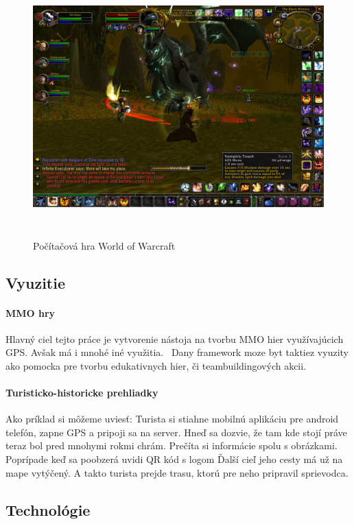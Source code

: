 \begin{figure}[h]
  \centering
  \includegraphics[height=10cm]{mainmatter/imgs/wow.jpg}
  \caption{Počítačová hra World of Warcraft}
  \label{fig:comenius}
\end{figure}


\subsection{Vyuzitie}
\paragraph{MMO hry}
Hlavný ciel tejto práce je vytvorenie nástoja na tvorbu MMO hier využívajúcich GPS. Avšak má i mnohé iné využitia. \
Dany framework moze byt taktiez vyuzity ako pomocka pre tvorbu edukativnych hier, či teambuildingových akcii. 

\paragraph{Turisticko-historicke prehliadky}
Ako príklad si môžeme uviesť: Turista si stiahne mobilnú aplikáciu pre android telefón, zapne GPS a pripoji sa na server. Hneď sa dozvie, že tam kde stojí práve teraz bol pred mnohymi rokmi chrám. Prečíta si informácie spolu s obrázkami. Poprípade keď sa poobzerá uvidi QR kód s logom Ďalší cieľ jeho cesty má už na mape vytýčený. A takto turista prejde trasu, ktorú pre neho pripravil sprievodca. 

\subsection{Technológie}


